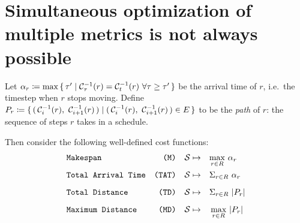 \section{Simultaneous optimization of multiple metrics is not always possible}\label{chapter:simultaneous_optimization}

Let \(\alpha_r \coloneqq \max\set{\tau' \mid \ensuremath{\mathcal{C}_{\tau}}^{-1}(r) = \ensuremath{\mathcal{C}_{t}}^{-1}(r)\ \forall \tau \geq \tau'}\) be the arrival time of \(r\), i.e.~the timestep when \(r\) stops moving.
Define \(P_r \coloneqq \set{ (\,  \ensuremath{\mathcal{C}_{i}}^{-1}(r),\ \ensuremath{\mathcal{C}_{i + 1}}^{-1}(r)  \,) \mid (\,  \ensuremath{\mathcal{C}_{i}}^{-1}(r),\ \ensuremath{\mathcal{C}_{i + 1}}^{-1}(r)  \,) \in E }\) to be the \emph{path} of \(r\): the sequence of steps \(r\) takes in a schedule. 

Then consider the following well-defined cost functions:
\begin{align*}
	& \texttt{Makespan} 				& \texttt{(M)} && \mathcal{S} \mapsto \quad & \smash{\max_{r \in R}} \ \alpha_r 	\\[2mm] 
	& \texttt{Total Arrival Time} 	& \texttt{(TAT)} && \mathcal{S} \mapsto \quad & \Sigma_{r \in R} \ \alpha_r 		\\[2mm]
	& \texttt{Total Distance} 		& \texttt{(TD)} && \mathcal{S} \mapsto \quad & \Sigma_{r \in R} \ \lvert P_r\rvert 		\\[2mm]
	& \texttt{Maximum Distance} 		& \texttt{(MD)} && \mathcal{S} \mapsto \quad & \max_{r \in R} \ \lvert P_r\rvert
\end{align*}


